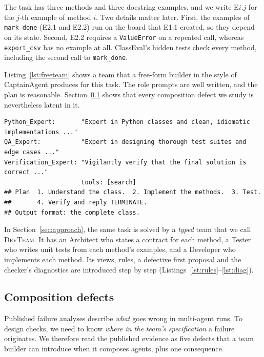 \documentclass[pdflatex,sn-mathphys-num]{sn-jnl}
\theoremstyle{thmstyleone}%
\theoremstyle{thmstyletwo}%
\theoremstyle{thmstylethree}%
\newcommand{\devteam}{\textsc{DevTeam}}
\newcommand{\code}[1]{\texttt{#1}}
\begin{document}
The task has three methods and three docstring examples, and we write E$i.j$
for the $j$-th example of method $i$. Two details matter later. First, the
examples of \code{mark\_done} (E2.1 and E2.2) run on the board that E1.1
created, so they depend on its state. Second, E2.2 requires a
\code{ValueError} on a repeated call, whereas \code{export\_csv} has no example
at all. ClassEval's hidden tests check every method, including the second call
to \code{mark\_done}.

Listing~\ref{lst:freeteam} shows a team that a free-form builder in the style
of CaptainAgent produces for this task. The role prompts are well written, and
the plan is reasonable. Section~\ref{sec:defects} shows that every composition
defect we study is nevertheless latent in it.

\begin{lstlisting}[float=tb, style=raw, caption={Raw input: a free-form team for \code{TaskBoard} (role prompts abridged; generated in the style of CaptainAgent~\cite{song2024captain}).}, label={lst:freeteam}]
Python_Expert:       "Expert in Python classes and clean, idiomatic implementations ..."
QA_Expert:           "Expert in designing thorough test suites and edge cases ..."
Verification_Expert: "Vigilantly verify that the final solution is correct ..."
                     tools: [search]
## Plan  1. Understand the class.  2. Implement the methods.  3. Test.
##       4. Verify and reply TERMINATE.
## Output format: the complete class.
\end{lstlisting}

In Section~\ref{sec:approach}, the same task is solved by a \emph{typed} team
that we call \devteam{}. It has an Architect who states a contract for each
method, a Tester who writes unit tests from each method's examples, and a
Developer who implements each method. Its views, rules, a defective first
proposal and the checker's diagnostics are introduced step by step
(Listings~\ref{lst:rules}--\ref{lst:diag}).

\subsection{Composition defects}\label{sec:defects}

Published failure analyses describe \emph{what} goes wrong in multi-agent runs.
To design checks, we need to know \emph{where in the team's specification} a
failure originates. We therefore read the published evidence as five defects
that a team builder can introduce when it composes agents, plus one
consequence.
\end{document}
